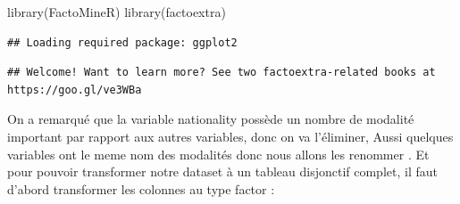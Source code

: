 \documentclass[
]{article}
\newenvironment{Shaded}{\begin{snugshade}}{\end{snugshade}}
\newcommand{\FunctionTok}[1]{\textcolor[rgb]{0.00,0.00,0.00}{#1}}
\newcommand{\NormalTok}[1]{#1}
\begin{document}
\begin{Shaded}
\begin{Highlighting}[]
\FunctionTok{library}\NormalTok{(FactoMineR)}
\FunctionTok{library}\NormalTok{(factoextra)}
\end{Highlighting}
\end{Shaded}

\begin{verbatim}
## Loading required package: ggplot2
\end{verbatim}

\begin{verbatim}
## Welcome! Want to learn more? See two factoextra-related books at https://goo.gl/ve3WBa
\end{verbatim}

On a remarqué que la variable nationality possède un nombre de modalité
important par rapport aux autres variables, donc on va l'éliminer, Aussi
quelques variables ont le meme nom des modalités donc nous allons les
renommer . Et pour pouvoir transformer notre dataset à un tableau
disjonctif complet, il faut d'abord transformer les colonnes au type
factor :
\end{document}
